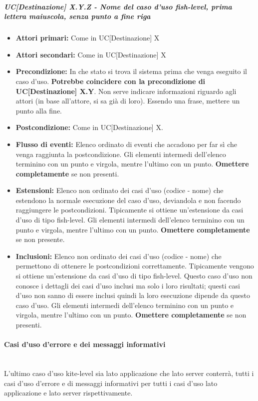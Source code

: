\subparagraph*{UC[Destinazione] X.Y.Z - Nome del caso d'uso fish-level, prima lettera maiuscola, senza punto a fine riga}%
\begin{itemize}
	\item \textbf{Attori primari:} Come in UC[Destinazione] X
	\item \textbf{Attori secondari:} Come in UC[Destinazione] X
	\item \textbf{Precondizione:} In che stato si trova il sistema prima che venga eseguito il caso d'uso. \textbf{Potrebbe coincidere con la precondizione di UC[Destinazione] X.Y}. Non serve indicare informazioni riguardo agli attori (in base all'attore, si sa già di loro). Essendo una frase, mettere un punto alla fine.
	\item \textbf{Postcondizione:} Come in UC[Destinazione] X.
	\item \textbf{Flusso di eventi:} Elenco ordinato di eventi che accadono per far sì che venga raggiunta la postcondizione. Gli elementi intermedi dell'elenco terminino con un punto e virgola, mentre l'ultimo con un punto. \textbf{Omettere completamente} se non presenti.
	\item \textbf{Estensioni:} Elenco non ordinato dei casi d'uso (codice - nome) che estendono la normale esecuzione del caso d'uso, deviandola e non facendo raggiungere le postcondizioni. Tipicamente si ottiene un'estensione da casi d'uso di tipo fish-level. Gli elementi intermedi dell'elenco terminino con un punto e virgola, mentre l'ultimo con un punto. \textbf{Omettere completamente} se non presente.
	\item \textbf{Inclusioni:} Elenco non ordinato dei casi d'uso (codice - nome) che permettono di ottenere le postcondizioni correttamente. Tipicamente vengono si ottiene un'estensione da casi d'uso di tipo fish-level. Questo caso d'uso non conosce i dettagli dei casi d'uso inclusi ma solo i loro risultati; questi casi d'uso non sanno di essere inclusi quindi la loro esecuzione dipende da questo caso d'uso. Gli elementi intermedi dell'elenco terminino con un punto e virgola, mentre l'ultimo con un punto.  \textbf{Omettere completamente} se non presenti.
\end{itemize}
\paragraph{Casi d'uso d'errore e dei messaggi informativi}\mbox{}\\
L'ultimo caso d'uso kite-level sia lato applicazione che lato server conterrà, tutti i casi d'uso d'errore e di messaggi informativi per tutti i casi d'uso lato applicazione e lato server rispettivamente.
